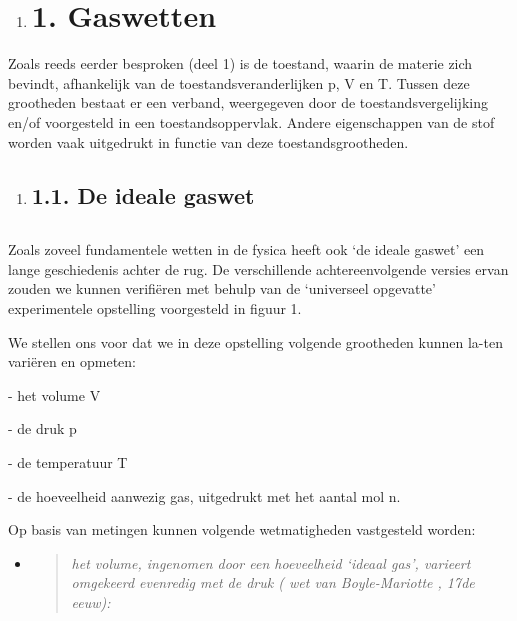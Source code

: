 \documentclass[]{article}
\date{}
\begin{document}
\begin{enumerate}
\item
  \section{1. Gaswetten}\label{gaswetten}
\end{enumerate}

Zoals reeds eerder besproken (deel 1) is de toestand, waarin de materie
zich bevindt, afhankelijk van de toestandsveranderlijken p, V en T.
Tussen deze grootheden bestaat er een verband, weergegeven door de
toestandsvergelijking en/of voorgesteld in een toestandsoppervlak.
Andere eigenschappen van de stof worden vaak uitgedrukt in functie van
deze toestandsgrootheden.

\begin{enumerate}
\item
  \subsection{1.1. De ideale gaswet}\label{de-ideale-gaswet}

  \subsection{}\label{section}
\end{enumerate}

Zoals zoveel fundamentele wetten in de fysica heeft ook `de ideale
gaswet' een lange geschiedenis achter de rug. De verschillende
achtereenvolgende versies ervan zouden we kunnen verifiëren met behulp
van de `universeel opgevatte' experimentele opstelling voorgesteld in
figuur 1.

We stellen ons voor dat we in deze opstelling volgende grootheden kunnen
la-ten variëren en opmeten:

- het volume V

- de druk p

- de temperatuur T

- de hoeveelheid aanwezig gas, uitgedrukt met het aantal mol n.

Op basis van metingen kunnen volgende wetmatigheden vastgesteld worden:

\begin{itemize}
\item
  \begin{quote}
  \emph{het volume, ingenomen door een hoeveelheid `ideaal gas',
  varieert omgekeerd evenredig met de druk ( wet van Boyle-Mariotte ,
  17de eeuw):}
  \end{quote}
\end{itemize}
\end{document}
